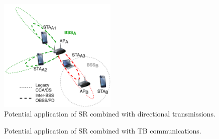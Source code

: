 \documentclass{article}
\begin{document}
\begin{figure}[ht!]
	\centering		
	\includegraphics[width=0.5\textwidth]{sr_and_beamforming}
	\caption{Potential application of SR combined with directional transmissions.}
	\label{fig:sr_and_beamforming}
\end{figure}

\begin{figure}[ht!]
	\centering		
	\caption{Potential application of SR combined with TB communications.}		
	\label{fig:sr_and_tb}
\end{figure}
\end{document}
